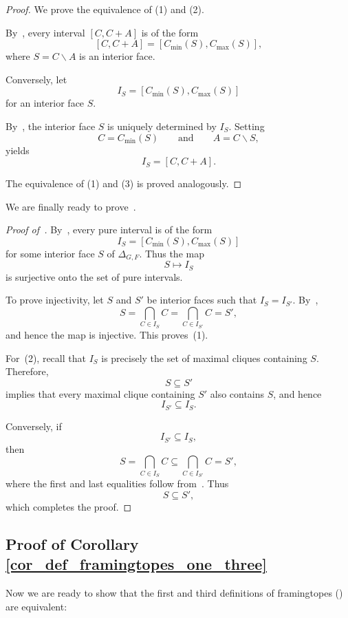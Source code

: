 \documentclass[12pt, reqno]{amsart}
\theoremstyle{plain}
\theoremstyle{definition}
\numberwithin{equation}{section}
\begin{document}
\begin{proof}
We prove the equivalence of (1) and (2).

By~, every interval $[C,C+A]$ is of the form
\[
[C,C+A]=[C_{\min}(S),C_{\max}(S)],
\]
where $S=C\smallsetminus A$ is an interior face.

Conversely, let
\[
I_S=[C_{\min}(S),C_{\max}(S)]
\]
for an interior face $S$.

By~, the interior face $S$ is uniquely determined by $I_S$. Setting
\[
C=C_{\min}(S)
\qquad\text{and}\qquad
A=C\smallsetminus S,
\]
 yields
\[
I_S=[C,C+A].
\]

The equivalence of (1) and (3) is proved analogously.
\end{proof}

We are finally ready to prove~.


\begin{proof}[Proof of~]
By~, every pure interval is of the form
\[
I_S=[C_{\min}(S),C_{\max}(S)]
\]
for some interior face $S$ of $\Delta_{G,F}$. Thus the map
\[
S \longmapsto I_S
\]
is surjective onto the set of pure intervals.

To prove injectivity, let $S$ and $S'$ be interior faces such that $I_S=I_{S'}$. By~,
\[
S=\bigcap_{C\in I_S} C
=\bigcap_{C\in I_{S'}} C
=S',
\]
and hence the map is injective. This proves~(1).

For~(2), recall that $I_S$ is precisely the set of maximal cliques containing $S$. Therefore,
\[
S\subseteq S'
\]
implies that every maximal clique containing $S'$ also contains $S$, and hence
\[
I_{S'}\subseteq I_S.
\]

Conversely, if
\[
I_{S'}\subseteq I_S,
\]
then
\[
S=\bigcap_{C\in I_S} C
\subseteq
\bigcap_{C\in I_{S'}} C
=S',
\]
where the first and last equalities follow from~. Thus
\[
S\subseteq S',
\]
which completes the proof.
\end{proof}


\subsection{Proof of Corollary \ref{cor_def_framingtopes_one_three}}
Now we are ready to show that the first and third definitions of framingtopes () are equivalent:
\end{document}
